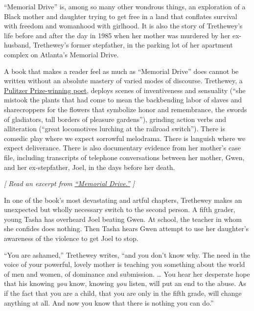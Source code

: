``Memorial Drive'' is, among so many other wondrous things, an
exploration of a Black mother and daughter trying to get free in a land
that conflates survival with freedom and womanhood with girlhood. It is
also the story of Trethewey's life before and after the day in 1985 when
her mother was murdered by her ex-husband, Trethewey's former
stepfather, in the parking lot of her apartment complex on Atlanta's
Memorial Drive.

A book that makes a reader feel as much as ``Memorial Drive'' does
cannot be written without an absolute mastery of varied modes of
discourse. Trethewey, a
\href{https://www.nytimes3xbfgragh.onion/2007/05/13/magazine/13wwln-Q4-t.html?searchResultPosition=5}{Pulitzer
Prize-winning poet}, deploys scenes of inventiveness and sensuality
(``she mistook the plants that had come to mean the backbending labor of
slaves and sharecroppers for the flowers that symbolize honor and
remembrance, the swords of gladiators, tall borders of pleasure
gardens''), grinding action verbs and alliteration (``great locomotives
lurching at the railroad switch''). There is comedic play where we
expect sorrowful melodrama. There is languish where we expect
deliverance. There is also documentary evidence from her mother's case
file, including transcripts of telephone conversations between her
mother, Gwen, and her ex-stepfather, Joel, in the days before her death.

\emph{{[} Read an excerpt from}
\href{https://www.nytimes3xbfgragh.onion/2020/07/30/books/review/memorial-drive-by-natasha-trethewey-an-excerpt.html}{\emph{``Memorial
Drive.''}} \emph{{]}}

In one of the book's most devastating and artful chapters, Trethewey
makes an unexpected but wholly necessary switch to the second person. A
fifth grader, young Tasha has overheard Joel beating Gwen. At school,
the teacher in whom she confides does nothing. Then Tasha hears Gwen
attempt to use her daughter's awareness of the violence to get Joel to
stop.

``You are ashamed,'' Trethewey writes, ``and you don't know why. The
need in the voice of your powerful, lovely mother is teaching you
something about the world of men and women, of dominance and submission.
\ldots{} You hear her desperate hope that his knowing \emph{you} know,
knowing \emph{you} listen, will put an end to the abuse. As if the fact
that you are a child, that you are only in the fifth grade, will change
anything at all. And now you know that there is nothing you can do.''

